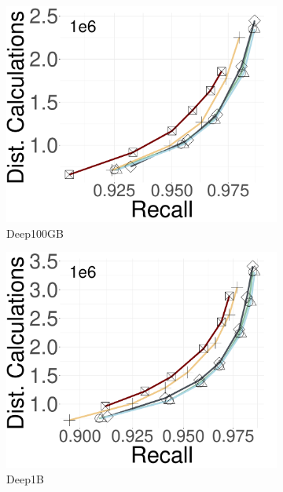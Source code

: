 \begin{figure}[ht]
\begin{subfigure}{0.28\columnwidth}
			\includegraphics[width=\textwidth]{../img/oigas/RND_RRND/DC_DEEP100GB.pdf}
		\caption{{Deep100GB}}
		\label{fig:ND:deep100GB}
		\end{subfigure}	
  \hspace{0.4cm}
		\begin{subfigure}{0.28\columnwidth}
			\centering
			\captionsetup{justification=centering}	
			\includegraphics[width=\textwidth]{../img/oigas/RND_RRND/DC_DEEP1B.pdf}
		\caption{{Deep1B}}%
		\label{fig:ND:deep1b}	
  \end{subfigure}	
		\begin{subfigure}{0.28\columnwidth}

\end{subfigure}
\end{figure}
